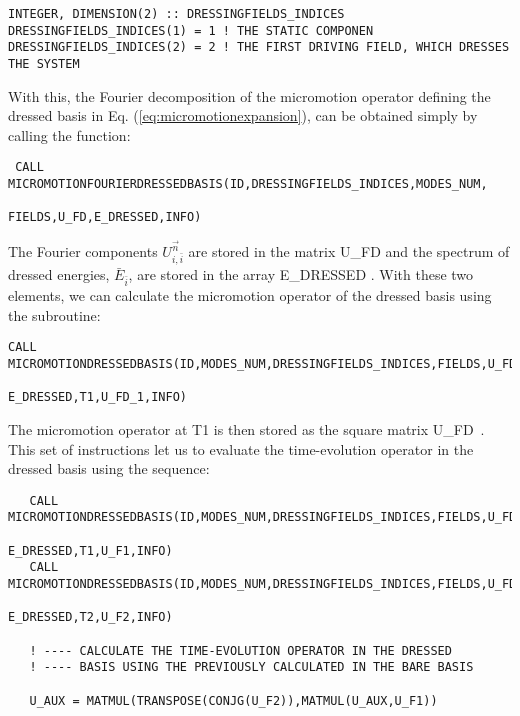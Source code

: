 \documentclass[10pt,a4paper]{article}
\begin{document}
\begin{verbatim}
INTEGER, DIMENSION(2) :: DRESSINGFIELDS_INDICES
DRESSINGFIELDS_INDICES(1) = 1 ! THE STATIC COMPONEN
DRESSINGFIELDS_INDICES(2) = 2 ! THE FIRST DRIVING FIELD, WHICH DRESSES THE SYSTEM
\end{verbatim} 

With this, the Fourier decomposition of the micromotion operator defining the dressed basis in Eq. (\ref{eq:micromotionexpansion}), can be obtained simply by calling the function:

\begin{verbatim}
 CALL MICROMOTIONFOURIERDRESSEDBASIS(ID,DRESSINGFIELDS_INDICES,MODES_NUM,
                                                     FIELDS,U_FD,E_DRESSED,INFO)
\end{verbatim}
The Fourier components $U_{i,\bar{i}}^{\vec{n}}$ are stored in the matrix   U\_FD  and the spectrum of dressed energies, $\bar{E}_{\bar{i}}$,  are stored in the array   E\_DRESSED .  With these two elements, we can calculate the micromotion operator of the dressed basis using the subroutine:

\begin{verbatim}
CALL MICROMOTIONDRESSEDBASIS(ID,MODES_NUM,DRESSINGFIELDS_INDICES,FIELDS,U_FD,
                                                            E_DRESSED,T1,U_FD_1,INFO) 
\end{verbatim}

The micromotion operator at T1 is then stored as the square matrix   U\_FD\ . This set of instructions let us to evaluate the time-evolution operator in the dressed basis using the sequence:

\begin{verbatim}
   CALL MICROMOTIONDRESSEDBASIS(ID,MODES_NUM,DRESSINGFIELDS_INDICES,FIELDS,U_FD,
                                                             E_DRESSED,T1,U_F1,INFO) 
   CALL MICROMOTIONDRESSEDBASIS(ID,MODES_NUM,DRESSINGFIELDS_INDICES,FIELDS,U_FD,
                                                             E_DRESSED,T2,U_F2,INFO) 
        
   ! ---- CALCULATE THE TIME-EVOLUTION OPERATOR IN THE DRESSED 
   ! ---- BASIS USING THE PREVIOUSLY CALCULATED IN THE BARE BASIS

   U_AUX = MATMUL(TRANSPOSE(CONJG(U_F2)),MATMUL(U_AUX,U_F1)) 

\end{verbatim}
\end{document}
